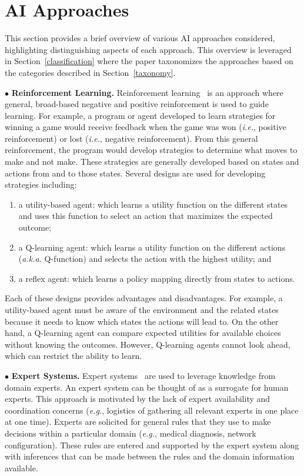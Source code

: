 \documentclass[conference]{IEEEtran}
\begin{document}
\section{AI Approaches}
\label{ml-approaches}

This section provides a brief overview of various AI approaches considered, highlighting distinguishing aspects of each approach.
This overview is leveraged in Section~\ref{classification} where the paper
taxonomizes the approaches based on the categories described in
Section~\ref{taxonomy}.

$\bullet$ {\bf Reinforcement Learning.}  Reinforcement learning~\cite{Kober:13}\cite{Russell:10}
is an approach where general, broad-based negative and positive reinforcement is used to guide learning. For example, a program or agent developed to learn strategies for winning a game would receive feedback when the game was won (\emph{i.e.}, positive reinforcement) or lost (\emph{i.e.}, negative reinforcement). From this general reinforcement, the program would develop strategies to determine what moves to make and not make.
These strategies are generally developed based on states and actions from and to those states. Several designs are used for developing strategies including:
\begin{enumerate}
\item a utility-based agent: which learns a utility function on the different states and uses this function to select an action that maximizes the expected outcome;
\item a Q-learning agent: which learns a utility function on the different actions (\emph{a.k.a.} Q-function) and selects the action with the highest utility; and
\item a reflex agent: which learns a policy mapping directly from states to actions.
\end{enumerate}

Each of these designs provides advantages and disadvantages. For example, a utility-based agent must be aware of the environment and the related states because it needs to know which states the actions will lead to. On the other hand, a Q-learning agent can compare expected utilities for available choices without knowing the outcomes. However, Q-learning agents cannot look ahead, which can restrict the ability to learn.

$\bullet$ {\bf Expert Systems.}  Expert systems~\cite{Russell:10} are used to leverage
knowledge from domain experts. An expert system can be thought of as a surrogate for
human experts. This approach is motivated by the lack of expert availability and coordination concerns (\emph{e.g.}, logistics of gathering all relevant experts in one place at one time). Experts are solicited for general
rules that they use to make decisions within a particular domain (\emph{e.g.}, medical diagnosis, network configuration). These rules are entered and supported by the expert system along with inferences that can be made between the rules and the domain information available.
\end{document}
